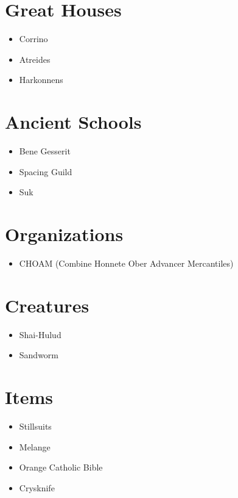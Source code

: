 \documentclass{article}
\begin{document}
\section{Great Houses}
\begin{itemize}
\item Corrino
\item Atreides 
\item Harkonnens
\end{itemize}

\section{Ancient Schools}
\begin{itemize}
\item Bene Gesserit 
\item Spacing Guild
\item Suk
\end{itemize}

\section{Organizations}
\begin{itemize}
\item CHOAM (Combine Honnete Ober Advancer Mercantiles)
\end{itemize}

\section{Creatures}
\begin{itemize}
\item Shai-Hulud
\item Sandworm 
\end{itemize}

\section{Items}
\begin{itemize}
\item Stillsuits
\item Melange
\item Orange Catholic Bible
\item Crysknife
\end{itemize}
\end{document}
